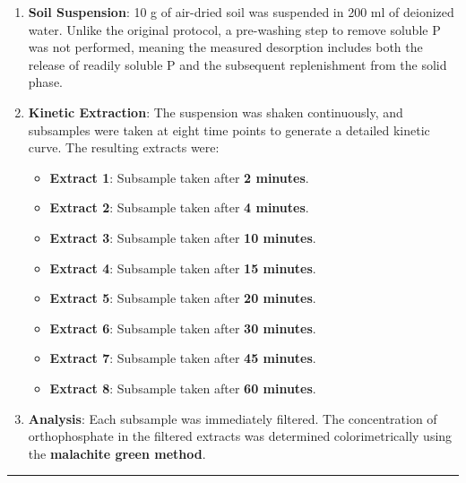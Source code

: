 \documentclass[
  a4paper,
]{article}
\providecommand{\tightlist}{%
  \setlength{\itemsep}{0pt}\setlength{\parskip}{0pt}}\usepackage{longtable,booktabs,array}
\begin{document}
\begin{enumerate}
\def\labelenumi{\arabic{enumi}.}
\item
  \textbf{Soil Suspension}: 10 g of air-dried soil was suspended in 200
  ml of deionized water. Unlike the original protocol, a pre-washing
  step to remove soluble P was not performed, meaning the measured
  desorption includes both the release of readily soluble P and the
  subsequent replenishment from the solid phase.
\item
  \textbf{Kinetic Extraction}: The suspension was shaken continuously,
  and subsamples were taken at eight time points to generate a detailed
  kinetic curve. The resulting extracts were:

  \begin{itemize}
  \tightlist
  \item
    \textbf{Extract 1}: Subsample taken after \textbf{2 minutes}.
  \item
    \textbf{Extract 2}: Subsample taken after \textbf{4 minutes}.
  \item
    \textbf{Extract 3}: Subsample taken after \textbf{10 minutes}.
  \item
    \textbf{Extract 4}: Subsample taken after \textbf{15 minutes}.
  \item
    \textbf{Extract 5}: Subsample taken after \textbf{20 minutes}.
  \item
    \textbf{Extract 6}: Subsample taken after \textbf{30 minutes}.
  \item
    \textbf{Extract 7}: Subsample taken after \textbf{45 minutes}.
  \item
    \textbf{Extract 8}: Subsample taken after \textbf{60 minutes}.
  \end{itemize}
\item
  \textbf{Analysis}: Each subsample was immediately filtered. The
  concentration of orthophosphate in the filtered extracts was
  determined colorimetrically using the \textbf{malachite green method}.
\end{enumerate}

\begin{center}\rule{0.5\linewidth}{0.5pt}\end{center}
\end{document}

